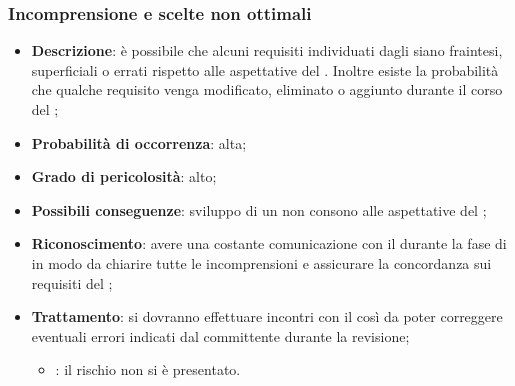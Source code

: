 \documentclass[PianoDiProgetto.tex]{subfiles}
\begin{document}
		\subsubsection{Incomprensione e scelte non ottimali}
			\label{sec:lr}
	\begin{itemize}
		\item \textbf{Descrizione}: è possibile che alcuni requisiti individuati dagli \ANP{} siano fraintesi, superficiali o errati rispetto alle aspettative del  \PROPONENTE{}. Inoltre esiste la probabilità che qualche requisito venga modificato, eliminato o aggiunto durante il corso del ;
		\item \textbf{Probabilità di occorrenza}: alta;
		\item \textbf{Grado di pericolosità}: alto;
		\item \textbf{Possibili conseguenze}: sviluppo di un  non consono alle aspettative del ;
		\item \textbf{Riconoscimento}: avere una costante comunicazione con il  \PROPONENTE{} durante la fase di \ARdoc{} in modo da chiarire tutte le incomprensioni e assicurare la concordanza sui requisiti del ;
		\item \textbf{Trattamento}: si dovranno effettuare incontri con il  \PROPONENTE{} così da poter correggere eventuali errori indicati dal committente durante la revisione;
		\begin{itemize}
				\item \PerAR : il rischio non si è presentato.
		\end{itemize}
	\end{itemize}	
	
\end{document}
